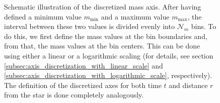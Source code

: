 \begin{figure}[h!]
\begin{center}
    \end{center}
    \caption{Schematic illustration of the discretized mass axis. After having defined a minimum 
        value $m_\text{min}$ and a maximum value $m_\text{max}$, the interval between these two 
        values is divided evenly into $\mathcal N_m$ bins. To do this, we first define the mass
        values at the bin boundaries and, from that, the mass values at the bin centers. 
        This can be done using either a linear or a logarithmic scaling (for details, see section
        \cref{subsec:axis_discretization_with_linear_scale} and
        \cref{subsec:axis_discretization_with_logarithmic_scale}, respectively). 
        The definition of the discretized
        axes for both time $t$ and distance $r$ from the star is done completely analogously.}
    \label{fig:continuous_and_discrete_mass_axis}
\end{figure}
